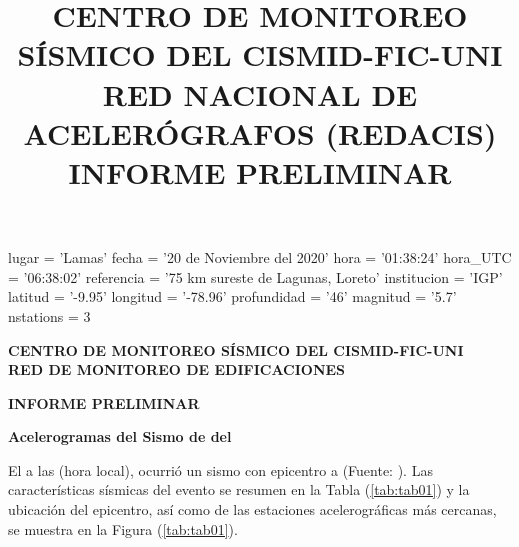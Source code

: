 \documentclass[11pt, a4paper]{report}
\title{CENTRO DE MONITOREO SÍSMICO DEL CISMID-FIC-UNI \\
RED NACIONAL DE ACELERÓGRAFOS (REDACIS)\\
INFORME PRELIMINAR\\
}
\begin{document}
\begin{pycode}
lugar = 'Lamas'
fecha = '20 de Noviembre del 2020'
hora = '01:38:24'
hora_UTC = '06:38:02'
referencia = '75 km sureste de Lagunas, Loreto'
institucion = 'IGP'
latitud = '-9.95'
longitud = '-78.96'
profundidad = '46'
magnitud = '5.7'
nstations = 3
\end{pycode}

\begin{center}
\centering 
\textbf{CENTRO DE MONITOREO SÍSMICO DEL CISMID-FIC-UNI \\
RED DE MONITOREO DE EDIFICACIONES}
\vspace{0.3cm}

\textbf{INFORME PRELIMINAR}
\vspace{0.3cm}

\textbf{Acelerogramas del Sismo de  del }
\vspace{0.25cm}
\end{center}

El  a las  (hora local), ocurrió un sismo con epicentro a  (Fuente: ). Las características sísmicas del evento 
se resumen en la Tabla (\ref{tab:tab01}) y la ubicación del epicentro, así como de las estaciones 
acelerográficas más cercanas, se muestra en la Figura (\ref{tab:tab01}). \\
\end{document}
